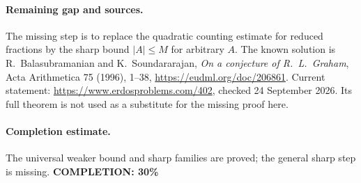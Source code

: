 \paragraph{Remaining gap and sources.}
The missing step is to replace the quadratic counting estimate for reduced
fractions by the sharp bound \(|A|\leq M\) for arbitrary \(A\).
The known solution is R.~Balasubramanian and K.~Soundararajan,
\emph{On a conjecture of R.~L.~Graham}, Acta Arithmetica 75 (1996),
1--38, \url{https://eudml.org/doc/206861}.
Current statement: \url{https://www.erdosproblems.com/402},
checked 24 September 2026. Its full theorem is not used as a substitute
for the missing proof here.

\paragraph{Completion estimate.}
The universal weaker bound and sharp families are proved; the general sharp step is missing.
\textbf{COMPLETION: 30\%}
